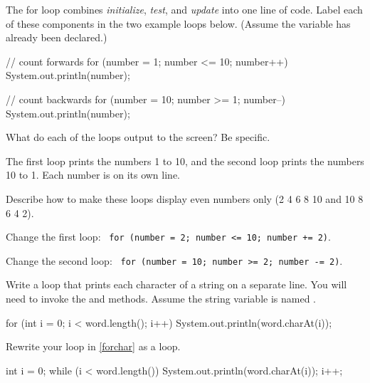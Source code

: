 
The for loop combines \emph{initialize}, \emph{test}, and \emph{update} into one line of code.
Label each of these components in the two example loops below.
(Assume the variable  has already been declared.)

\vspace{1ex}
\begin{javalst}
    // count forwards
    for (number = 1; number <= 10; number++) {
        System.out.println(number);
    }

    // count backwards
    for (number = 10; number >= 1; number--) {
        System.out.println(number);
    }
\end{javalst}




\Q What do each of the  loops output to the screen? Be specific.

\begin{answer}
The first loop prints the numbers 1 to 10, and the second loop prints the numbers 10 to 1.
Each number is on its own line.
\end{answer}


\Q Describe how to make these loops display even numbers only (2 4 6 8 10 and 10 8 6 4 2).

\begin{answer}
Change the first loop: ~\texttt{for (number = 2; number <= 10; number += 2)}.

Change the second loop: ~\texttt{for (number = 10; number >= 2; number -= 2)}.
\end{answer}


\Q \label{forchar} Write a  loop that prints each character of a string on a separate line.
You will need to invoke the  and  methods.
Assume the string variable is named .

\begin{answer}[6em]
\vspace{-1ex}
\begin{javaans}
    for (int i = 0; i < word.length(); i++) {
        System.out.println(word.charAt(i));
    }
\end{javaans}
\end{answer}


\Q Rewrite your  loop in \ref{forchar} as a  loop.

\begin{answer}[8em]
\vspace{-1ex}
\begin{javaans}
    int i = 0;
    while (i < word.length()) {
        System.out.println(word.charAt(i));
        i++;
    }
\end{javaans}
\end{answer}


